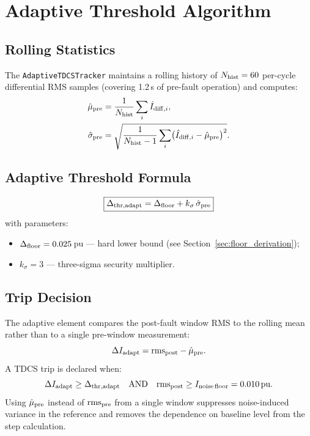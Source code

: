 \documentclass[11pt,a4paper]{article}
\begin{document}
\section{Adaptive Threshold Algorithm}

\subsection{Rolling Statistics}

The \texttt{AdaptiveTDCSTracker} maintains a rolling history of
$N_{\rm hist} = 60$ per-cycle differential RMS samples (covering 1.2\,s of
pre-fault operation) and computes:
\begin{align}
  \hat{\mu}_{\rm pre}   &= \frac{1}{N_{\rm hist}}\sum_{i} \hat{I}_{{\rm diff},i},
  \label{eq:mu_hat}\\
  \hat{\sigma}_{\rm pre}&= \sqrt{\frac{1}{N_{\rm hist}-1}
    \sum_{i}\bigl(\hat{I}_{{\rm diff},i}-\hat{\mu}_{\rm pre}\bigr)^2}.
  \label{eq:sigma_hat}
\end{align}

\subsection{Adaptive Threshold Formula}

\begin{equation}
  \boxed{
    \Delta_{\rm thr,adapt} = \Delta_{\rm floor}
                            + k_{\sigma}\,\hat{\sigma}_{\rm pre}
  }
  \label{eq:thr_adapt}
\end{equation}
with parameters:
\begin{itemize}
  \item $\Delta_{\rm floor} = 0.025$\,pu --- hard lower bound (see
    Section~\ref{sec:floor_derivation});
  \item $k_{\sigma} = 3$ --- three-sigma security multiplier.
\end{itemize}

\subsection{Trip Decision}

The adaptive element compares the post-fault window RMS to the rolling mean
rather than to a single pre-window measurement:
\begin{equation}
  \Delta I_{\rm adapt} = \mathrm{rms}_{\rm post} - \hat{\mu}_{\rm pre}.
  \label{eq:delta_I_adapt}
\end{equation}
A TDCS trip is declared when:
\begin{equation}
  \Delta I_{\rm adapt} \geq \Delta_{\rm thr,adapt}
  \quad\text{AND}\quad
  \mathrm{rms}_{\rm post} \geq I_{\rm noise\,floor} = 0.010\,\text{pu}.
  \label{eq:trip_adapt}
\end{equation}
Using $\hat{\mu}_{\rm pre}$ instead of $\mathrm{rms}_{\rm pre}$ from a
single window suppresses noise-induced variance in the reference and
removes the dependence on baseline level from the step calculation.
\end{document}

